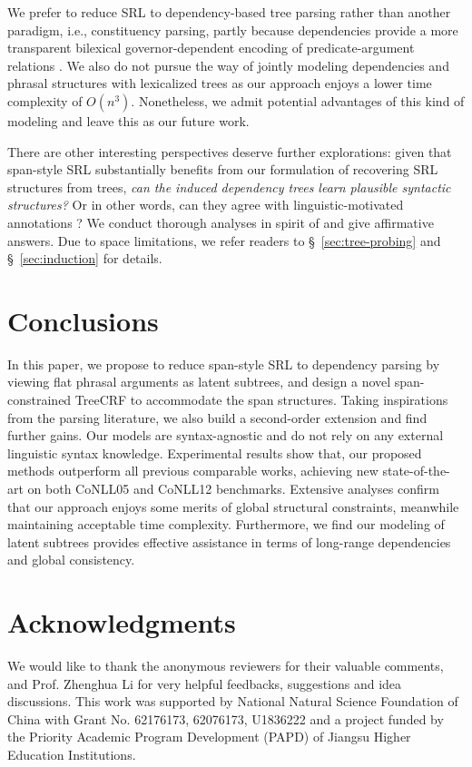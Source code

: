 \documentclass[11pt]{article}
\begin{document}
We prefer to reduce SRL to dependency-based tree parsing rather than another paradigm, i.e., constituency parsing, partly because dependencies provide a more transparent bilexical governor-dependent encoding of predicate-argument relations \cite{hacioglu-2004-semantic}.
We also do not pursue the way of jointly modeling dependencies and phrasal structures with lexicalized trees \cite{eisner-satta-1999-efficient,yang-tu-2022-combining,lou-etal-2022-nested} as our approach enjoys a lower time complexity of $O(n^3)$.
Nonetheless, we admit potential advantages of this kind of modeling \cite{liu-etal-2022-structured} and leave this as our future work.

There are other interesting perspectives deserve further explorations: given that span-style SRL substantially benefits from our formulation of recovering SRL structures from trees, \emph{can the induced dependency trees learn plausible syntactic structures?} Or in other words, can they agree with linguistic-motivated annotations \cite{marcus-etal-1993-building}?
We conduct thorough analyses in spirit of \citet{gormley-etal-2014-low,li-etal-2021-syntax} and give affirmative answers.
Due to space limitations, we refer readers to \S~\ref{sec:tree-probing} and \S~\ref{sec:induction} for details.


\section{Conclusions}\label{sec:conclusions}

In this paper, we propose to reduce span-style SRL to dependency parsing by viewing flat phrasal arguments as latent subtrees, and design a novel span-constrained TreeCRF to accommodate the span structures.
Taking inspirations from the parsing literature, we also build a second-order extension and find further gains.
Our models are syntax-agnostic and do not rely on any external linguistic syntax knowledge.
Experimental results show that, our proposed methods outperform all previous comparable works, achieving new state-of-the-art on both CoNLL05 and CoNLL12 benchmarks.
Extensive analyses confirm that our approach enjoys some merits of global structural constraints, meanwhile maintaining acceptable time complexity.
Furthermore, we find our modeling of latent subtrees provides effective assistance in terms of long-range dependencies and global consistency.


\section{Acknowledgments}\label{sec:ack}
We would like to thank the anonymous reviewers for their valuable comments, and Prof. Zhenghua Li for very helpful feedbacks, suggestions and idea discussions.
This work was supported by National Natural Science Foundation of China with Grant No. 62176173, 62076173, U1836222 and a project funded by the Priority Academic Program Development (PAPD) of Jiangsu Higher Education Institutions.
\end{document}
